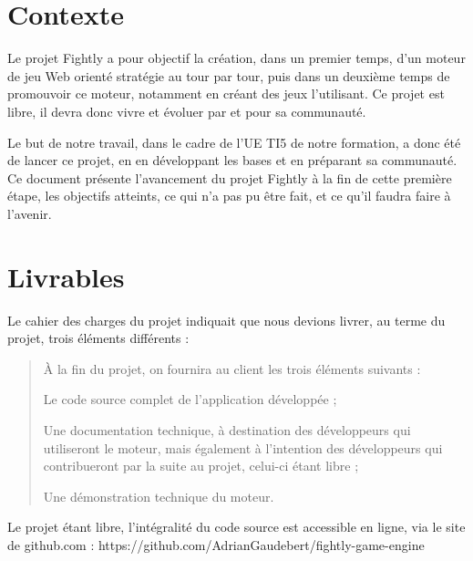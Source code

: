 \documentclass[a4paper,10pt]{report}
\begin{document}
  

  \tableofcontents

  \setlength{\parskip}{0.1in}

  \chapter{Contexte}

  Le projet Fightly a pour objectif la création, dans un premier temps, d'un moteur de jeu Web orienté stratégie au tour par tour, puis dans un deuxième temps de promouvoir ce moteur, notamment en créant des jeux l'utilisant. Ce projet est libre, il devra donc vivre et évoluer par et pour sa communauté. 

  Le but de notre travail, dans le cadre de l'UE TI5 de notre formation, a donc été de lancer ce projet, en en développant les bases et en préparant sa communauté. Ce document présente l'avancement du projet Fightly à la fin de cette première étape, les objectifs atteints, ce qui n'a pas pu être fait, et ce qu'il faudra faire à l'avenir. 

  \chapter{Livrables}

    Le cahier des charges du projet indiquait que nous devions livrer, au terme du projet, trois éléments différents : 

    \begin{quote}
      À la fin du projet, on fournira au client les trois éléments suivants : 

      \begin{list}{-}{}
	\item{Le code source complet de l'application développée ;}
	\item{Une documentation technique, à destination des développeurs qui utiliseront le moteur, mais également à l'intention des développeurs qui contribueront par la suite au projet, celui-ci étant libre ;}
	\item{Une démonstration technique du moteur.}
      \end{list}
    \end{quote}

    Le projet étant libre, l'intégralité du code source est accessible en ligne, via le site de github.com : https://github.com/AdrianGaudebert/fightly-game-engine
\end{document}
